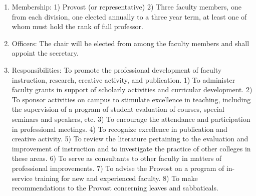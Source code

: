 \documentclass[letterpaper, 11pt]{article}
\begin{document}
				\begin{enumerate}[label=\alph*)]
					\item{Membership:}
					1) Provost (or representative)
					2) Three faculty members, one from each division, one elected annually to a three year term, at least one of whom must hold the rank of full professor.
					\item{Officers:}
					The chair will be elected from among the faculty members and shall appoint the secretary.
					\item{Responsibilities:}
					To promote the professional development of faculty instruction, research, creative activity, and publication.
					1) To administer faculty grants in support of scholarly activities and curricular development.
					2) To sponsor activities on campus to stimulate excellence in teaching, including the supervision of a program of student evaluation of courses, special seminars and speakers, etc.
					3) To encourage the attendance and participation in professional meetings.
					4) To recognize excellence in publication and creative activity.
					5) To review the literature pertaining to the evaluation and improvement of instruction and to investigate the practice of other colleges in these areas.
					6) To serve as consultants to other faculty in matters of professional improvements.
					7) To advise the Provost on a program of in-service training for new and experienced faculty.
					8) To make recommendations to the Provost concerning leaves and sabbaticals.
				\end{enumerate}
\end{document}

